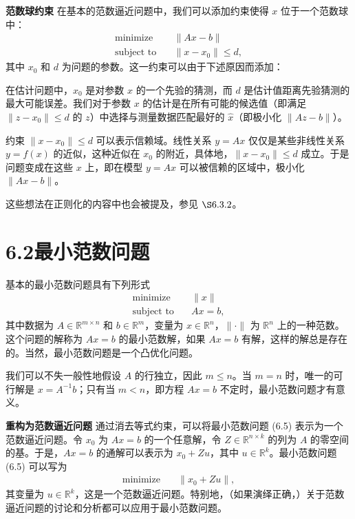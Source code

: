 \documentclass[UTF8,12pt,a4paper,fontset=fandol]{ctexart}
\begin{document}
\noindent\textbf{范数球约束}\quad
在基本的范数逼近问题中，我们可以添加约束使得 $x$ 位于一个范数球中：
\[
\begin{aligned}
\text{minimize}\quad & \|Ax-b\|\\
\text{subject to}\quad & \|x-x_0\|\leq d,
\end{aligned}
\]
其中 $x_0$ 和 $d$ 为问题的参数。这一约束可以由于下述原因而添加：

在估计问题中，$x_0$ 是对参数 $x$ 的一个先验的猜测，而 $d$ 是估计值距离先验猜测的最大可能误差。我们对于参数 $x$ 的估计是在所有可能的候选值（即满足 $\|z-x_0\|\leq d$ 的 $z$）中选择与测量数据匹配最好的 $\hat{x}$（即极小化 $\|Az-b\|$）。

约束 $\|x-x_0\|\leq d$ 可以表示信赖域。线性关系 $y=Ax$ 仅仅是某些非线性关系 $y=f(x)$ 的近似，这种近似在 $x_0$ 的附近，具体地，$\|x-x_0\|\leq d$ 成立。于是问题变成在这些 $x$ 上，即在模型 $y=Ax$ 可以被信赖的区域中，极小化 $\|Ax-b\|$。

这些想法在正则化的内容中也会被提及，参见 $\S 6.3.2$。

\section*{6.2\quad 最小范数问题}

基本的最小范数问题具有下列形式
\begin{equation}
\begin{aligned}
\text{minimize}\quad & \|x\|\\
\text{subject to}\quad & Ax=b,
\end{aligned}
\tag{6.5}
\end{equation}
其中数据为 $A\in\mathbb{R}^{m\times n}$ 和 $b\in\mathbb{R}^m$，变量为 $x\in\mathbb{R}^n$，$\|\cdot\|$ 为 $\mathbb{R}^n$ 上的一种范数。这个问题的解称为 $Ax=b$ 的最小范数解，如果 $Ax=b$ 有解，这样的解总是存在的。当然，最小范数问题是一个凸优化问题。

我们可以不失一般性地假设 $A$ 的行独立，因此 $m\leq n$。当 $m=n$ 时，唯一的可行解是 $x=A^{-1}b$；只有当 $m<n$，即方程 $Ax=b$ 不定时，最小范数问题才有意义。

\noindent\textbf{重构为范数逼近问题}\quad
通过消去等式约束，可以将最小范数问题 (6.5) 表示为一个范数逼近问题。令 $x_0$ 为 $Ax=b$ 的一个任意解，令 $Z\in\mathbb{R}^{n\times k}$ 的列为 $A$ 的零空间的基。于是，$Ax=b$ 的通解可以表示为 $x_0+Zu$，其中 $u\in\mathbb{R}^k$。最小范数问题 (6.5) 可以写为
\[
\begin{aligned}
\text{minimize}\quad & \|x_0+Zu\|,
\end{aligned}
\]
其变量为 $u\in\mathbb{R}^k$，这是一个范数逼近问题。特别地，（如果演绎正确，）关于范数逼近问题的讨论和分析都可以应用于最小范数问题。
\end{document}
